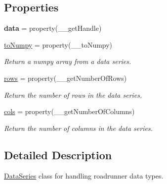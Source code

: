 \subsection*{Properties}
\begin{DoxyCompactItemize}
\item 
\hypertarget{classpython_1_1telplugins_1_1_data_series_a484661d2e01e165fa84cfdf528d76276}{{\bfseries data} = property(\-\_\-\-\_\-get\-Handle)}\label{classpython_1_1telplugins_1_1_data_series_a484661d2e01e165fa84cfdf528d76276}

\item 
\hyperlink{classpython_1_1telplugins_1_1_data_series_a82084dee126303cc0322e31e48239e76}{to\-Numpy} = property(\-\_\-\-\_\-to\-Numpy)
\begin{DoxyCompactList}\small\item\em Return a numpy array from a data series. \end{DoxyCompactList}\item 
\hyperlink{classpython_1_1telplugins_1_1_data_series_a79a79ef89d47682c0fcc0620d1bf21b5}{rows} = property(\-\_\-\-\_\-get\-Number\-Of\-Rows)
\begin{DoxyCompactList}\small\item\em Return the number of rows in the data series. \end{DoxyCompactList}\item 
\hyperlink{classpython_1_1telplugins_1_1_data_series_afb458f814018a15446b32052d4d2b4cf}{cols} = property(\-\_\-\-\_\-get\-Number\-Of\-Columns)
\begin{DoxyCompactList}\small\item\em Return the number of columns in the data series. \end{DoxyCompactList}\end{DoxyCompactItemize}


\subsection{Detailed Description}
\hyperlink{classpython_1_1telplugins_1_1_data_series}{Data\-Series} class for handling roadrunner data types. 

